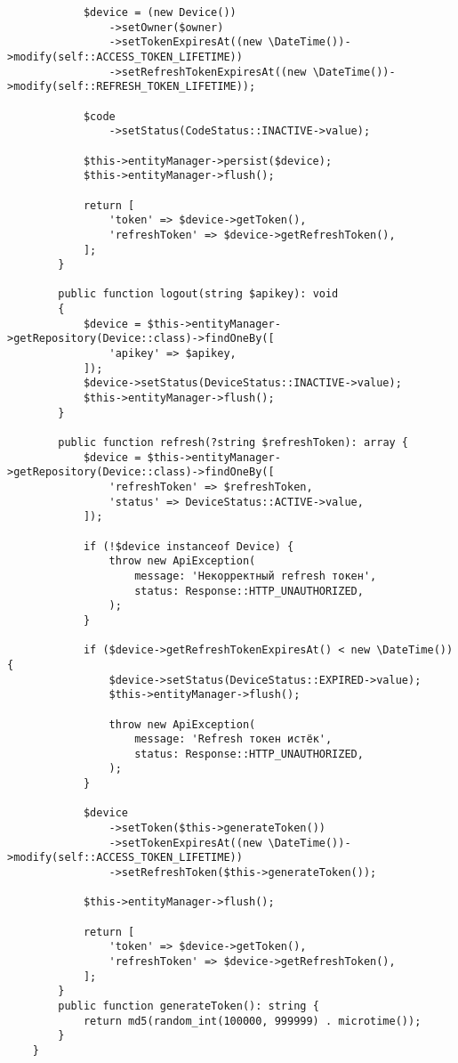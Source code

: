 \documentclass[pract]{SCWorks}
\begin{document}
\begin{verbatim}
            $device = (new Device())
                ->setOwner($owner)
                ->setTokenExpiresAt((new \DateTime())->modify(self::ACCESS_TOKEN_LIFETIME))
                ->setRefreshTokenExpiresAt((new \DateTime())->modify(self::REFRESH_TOKEN_LIFETIME));
            
            $code
                ->setStatus(CodeStatus::INACTIVE->value);
    
            $this->entityManager->persist($device);
            $this->entityManager->flush();
    
            return [
                'token' => $device->getToken(),
                'refreshToken' => $device->getRefreshToken(),
            ];
        }
    
        public function logout(string $apikey): void
        {
            $device = $this->entityManager->getRepository(Device::class)->findOneBy([
                'apikey' => $apikey,
            ]);
            $device->setStatus(DeviceStatus::INACTIVE->value);
            $this->entityManager->flush();
        }
    
        public function refresh(?string $refreshToken): array {
            $device = $this->entityManager->getRepository(Device::class)->findOneBy([
                'refreshToken' => $refreshToken,
                'status' => DeviceStatus::ACTIVE->value,
            ]);
    
            if (!$device instanceof Device) {
                throw new ApiException(
                    message: 'Некорректный refresh токен',
                    status: Response::HTTP_UNAUTHORIZED,
                );
            }
    
            if ($device->getRefreshTokenExpiresAt() < new \DateTime()) {
                $device->setStatus(DeviceStatus::EXPIRED->value);
                $this->entityManager->flush();
    
                throw new ApiException(
                    message: 'Refresh токен истёк',
                    status: Response::HTTP_UNAUTHORIZED,
                );
            }
    
            $device
                ->setToken($this->generateToken())
                ->setTokenExpiresAt((new \DateTime())->modify(self::ACCESS_TOKEN_LIFETIME))
                ->setRefreshToken($this->generateToken());
    
            $this->entityManager->flush();
    
            return [
                'token' => $device->getToken(),
                'refreshToken' => $device->getRefreshToken(),
            ];
        }
        public function generateToken(): string {
            return md5(random_int(100000, 999999) . microtime());
        }
    }
    \end{verbatim}
\end{document}

